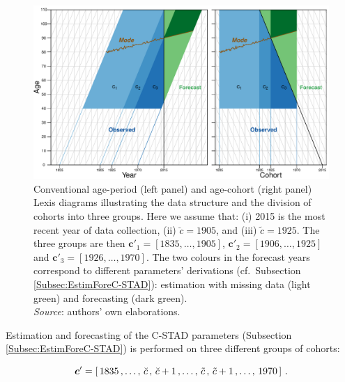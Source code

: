 \documentclass[11pt, a4paper]{article}
\newcommand{\tikzmark}[1]{\tikz[overlay,remember picture,baseline=(#1.base)]
	\node (#1) {\strut};}
\begin{document}
\begin{figure}[t]
	\begin{center}
		\includegraphics[scale=0.7]{./Figures/F3.pdf} 
		\caption{Conventional age-period (left panel) and age-cohort (right panel) Lexis diagrams illustrating the data structure and the division of cohorts into three groups. Here we assume that: (i) 2015 is the most recent year of data collection, (ii) $\breve{c}=1905$, and (iii) $\tilde{c}=1925$. The three groups are then {\color{red}$\bm{c}'_1=\left[1835,\dots,1905\right]$, $\bm{c}'_2=\left[1906, \dots, 1925\right]$ and $\bm{c}'_3=\left[1926, \dots, 1970\right]$}. The two colours in the forecast years correspond to different parameters' derivations (cf.~Subsection \ref{Subsec:EstimForeC-STAD}): estimation with missing data (light green) and forecasting (dark green). \\
		\small \textit{Source}: authors' own elaborations. \label{Fig:Lexis}}    
	\end{center}
\end{figure}

\newpage

Estimation and forecasting of the C-STAD parameters (Subsection \ref{Subsec:EstimForeC-STAD}) is performed on three different groups of cohorts:
{\color{red}
\begin{equation}\label{eq:CohortDiv}
\bm{c}' = \left[ \, \tikzmark{lowerC1}1835 \, , \dots , \, \breve{c}\tikzmark{upperC1} \, , \, \tikzmark{lowerC2}\breve{c}+1 \, , \dots, \, \tilde{c}\tikzmark{upperC2} \, , \, \tikzmark{lowerC3}\tilde{c} + 1 \, , \dots, \, 1970\tikzmark{upperC3} \, \right] \, .
\end{equation}	

	
}
\end{document}
